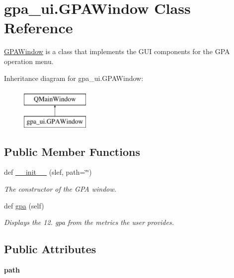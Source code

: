 \hypertarget{classgpa__ui_1_1_g_p_a_window}{}\section{gpa\+\_\+ui.\+G\+P\+A\+Window Class Reference}
\label{classgpa__ui_1_1_g_p_a_window}


\hyperlink{classgpa__ui_1_1_g_p_a_window}{G\+P\+A\+Window} is a class that implements the G\+UI components for the G\+PA operation menu.  


Inheritance diagram for gpa\+\_\+ui.\+G\+P\+A\+Window\+:\begin{figure}[H]
\begin{center}
\leavevmode
\includegraphics[height=2.000000cm]{classgpa__ui_1_1_g_p_a_window}
\end{center}
\end{figure}
\subsection*{Public Member Functions}
\begin{DoxyCompactItemize}
\item 
def \hyperlink{classgpa__ui_1_1_g_p_a_window_af341d6a11fb5030a5136cce247c95530}{\+\_\+\+\_\+init\+\_\+\+\_\+} (slef, path=\char`\"{}\char`\"{})
\begin{DoxyCompactList}\small\item\em The constructor of the G\+PA window. \end{DoxyCompactList}\item 
def \hyperlink{classgpa__ui_1_1_g_p_a_window_a36e992cfdee2fc99be76c95f6a342249}{gpa} (self)
\begin{DoxyCompactList}\small\item\em Displays the 12. gpa from the metrics the user provides. \end{DoxyCompactList}\end{DoxyCompactItemize}
\subsection*{Public Attributes}
\begin{DoxyCompactItemize}
\item 
\mbox{\label{classgpa__ui_1_1_g_p_a_window_a34487c55a57218bbaac85f9d1d7ab75e}} 
{\bfseries path}
\end{DoxyCompactItemize}


